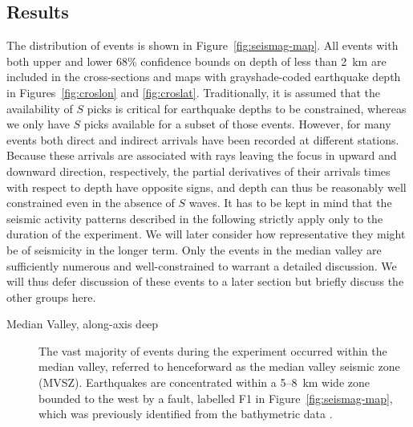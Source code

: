 \documentclass[jgr]{agu2001}
\begin{document}
\begin{article}
\subsection{Results}

The distribution of events is shown in
Figure~\ref{fig:seismag-map}. All events with both upper
and lower 68\% confidence bounds on depth of less than 2~km are
included in the cross-sections and maps with grayshade-coded earthquake
depth in Figures~\ref{fig:croslon} and \ref{fig:croslat}.
Traditionally, it is assumed that the availability of $S$ picks is
critical for earthquake depths to be constrained, whereas we only have
$S$ picks available for a subset of those events.  However, for many
events both direct and indirect arrivals have been recorded at
different stations.  Because these arrivals are associated with rays leaving
the focus in upward and downward direction, respectively, the
partial derivatives of their arrivals times with respect to depth have
opposite signs, and depth can thus be reasonably well constrained even
in the absence of $S$ waves.
It has to be kept in mind that the seismic activity patterns described
in the following strictly apply only to the duration of the
experiment. We will later consider how representative they might be of
seismicity in the longer term.  Only the events in the median valley
are sufficiently numerous and well-constrained to warrant a detailed
discussion.  We will thus defer discussion of these events to a later
section but briefly discuss the other groups here.
\begin{description}
\item[Median Valley, along-axis deep]  The vast majority of events during the
experiment occurred within the median valley, referred to henceforward
as the median valley seismic zone (MVSZ).  Earthquakes are
concentrated within a 5--8~km wide zone bounded to the west by a
fault, labelled F1 in Figure~\ref{fig:seismag-map}, which was
previously identified from the bathymetric data \citep{reston02}.


\end{description}
\end{article}
\end{document}
